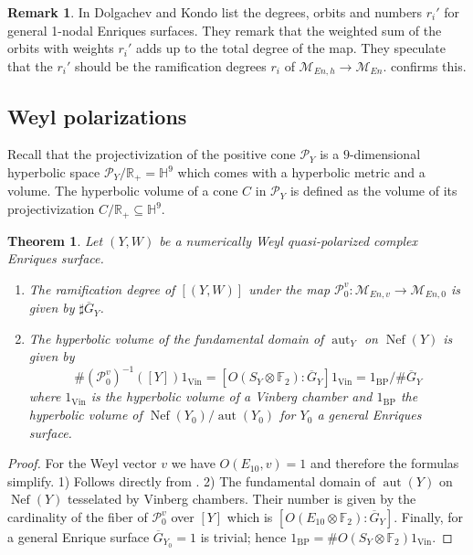 \documentclass{amsart}
\theoremstyle{definition}
\newtheorem{remark}[definition]{Remark}
\theoremstyle{plain}
\newtheorem{theorem}[definition]{Theorem}
\DeclareMathOperator{\Nef}{Nef}
\DeclareMathOperator{\aut}{aut}
\newcommand{\FF}{\mathbb{F}}
\newcommand{\RR}{\mathbb{R}}
\newcommand{\M}{\mathcal{M}}
\renewcommand{\P}{\mathcal{P}}
\newcommand{\Gbar}{\overline{G}}
\begin{document}
\begin{remark}
In \cite[Table 8.3]{enriquesII} Dolgachev and Kondo list the degrees, orbits and numbers $r_i'$ for general 1-nodal Enriques surfaces. They remark that the weighted sum of the orbits with weights $r_i'$ adds up to the total degree of the map. They speculate that the $r_i'$ should be the ramification degrees $r_i$ of $\M_{En,h} \to \M_{En}$.  confirms this.
\end{remark}

\subsection{Weyl polarizations}
Recall that the projectivization of the positive cone $\P_Y$ is a $9$-dimensional hyperbolic space $\P_Y/\RR_+ = \mathbb{H}^9$ which comes with a hyperbolic metric and a volume. The hyperbolic volume of a cone $C$ in $\P_Y$ is defined as the volume of its projectivization $C/\RR_+ \subseteq \mathbb{H}^9$.
\begin{theorem}
Let $(Y,W)$ be a numerically Weyl quasi-polarized complex Enriques surface.
\begin{enumerate}
\item The ramification degree of $[(Y,W)]$ under the map $\P^v_0 \colon \M_{En,v} \to \M_{En,0}$
is given by $\sharp \Gbar_Y$.
\item The hyperbolic volume of the fundamental domain of $\aut_Y$ on $\Nef(Y)$ is given by
\[ \#(\P^v_0)^{-1}([Y])1_{\mathrm{Vin}}= \left[ O(S_Y \otimes \FF_2) : \Gbar_Y\right]1_{\mathrm{Vin}}= 1_{\mathrm{BP}}/\#\Gbar_Y\]
where $1_{\mathrm{Vin}}$ is the hyperbolic volume of a Vinberg chamber
and $1_{\mathrm{BP}}$ the hyperbolic volume of $\Nef(Y_0)/\aut(Y_0)$ for $Y_0$ a general Enriques surface.
\end{enumerate}
\end{theorem}
\begin{proof}
For the Weyl vector $v$ we have $O(E_{10},v) = 1$ and therefore the formulas simplify.
1) Follows directly from .
2) The fundamental domain of $\aut(Y)$ on $\Nef(Y)$ tesselated by Vinberg chambers.
Their number is given by the cardinality of the fiber of $\P^v_0$ over $[Y]$ which is $[O(E_{10}\otimes \FF_2): \Gbar_Y]$.
Finally, for a general Enrique surface $\Gbar_{Y_0}=1$ is trivial; hence $1_\mathrm{{BP}}= \# O(S_Y\otimes \FF_2) 1_{\mathrm{Vin}}$.
\end{proof}
\end{document}
